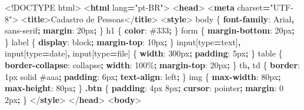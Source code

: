 \documentclass[
]{book}
\newenvironment{Shaded}{\begin{snugshade}}{\end{snugshade}}
\newcommand{\CharTok}[1]{\textcolor[rgb]{0.31,0.60,0.02}{#1}}
\newcommand{\ConstantTok}[1]{\textcolor[rgb]{0.56,0.35,0.01}{#1}}
\newcommand{\DataTypeTok}[1]{\textcolor[rgb]{0.13,0.29,0.53}{#1}}
\newcommand{\DecValTok}[1]{\textcolor[rgb]{0.00,0.00,0.81}{#1}}
\newcommand{\ExtensionTok}[1]{#1}
\newcommand{\FunctionTok}[1]{\textcolor[rgb]{0.13,0.29,0.53}{\textbf{#1}}}
\newcommand{\KeywordTok}[1]{\textcolor[rgb]{0.13,0.29,0.53}{\textbf{#1}}}
\newcommand{\NormalTok}[1]{#1}
\newcommand{\OperatorTok}[1]{\textcolor[rgb]{0.81,0.36,0.00}{\textbf{#1}}}
\newcommand{\OtherTok}[1]{\textcolor[rgb]{0.56,0.35,0.01}{#1}}
\newcommand{\SpecialStringTok}[1]{\textcolor[rgb]{0.31,0.60,0.02}{#1}}
\newcommand{\StringTok}[1]{\textcolor[rgb]{0.31,0.60,0.02}{#1}}
\begin{document}
\begin{Shaded}
\begin{Highlighting}[]
\DataTypeTok{\textless{}!DOCTYPE}\NormalTok{ html}\DataTypeTok{\textgreater{}}
\DataTypeTok{\textless{}}\KeywordTok{html}\OtherTok{ lang}\OperatorTok{=}\StringTok{"pt{-}BR"}\DataTypeTok{\textgreater{}}
\DataTypeTok{\textless{}}\KeywordTok{head}\DataTypeTok{\textgreater{}}
\DataTypeTok{\textless{}}\KeywordTok{meta}\OtherTok{ charset}\OperatorTok{=}\StringTok{"UTF{-}8"}\DataTypeTok{\textgreater{}}
\DataTypeTok{\textless{}}\KeywordTok{title}\DataTypeTok{\textgreater{}}\NormalTok{Cadastro de Pessoas}\DataTypeTok{\textless{}/}\KeywordTok{title}\DataTypeTok{\textgreater{}}
\DataTypeTok{\textless{}}\KeywordTok{style}\DataTypeTok{\textgreater{}}
\NormalTok{  body \{ }\KeywordTok{font{-}family}\CharTok{:} \DecValTok{Arial}\OperatorTok{,} \DecValTok{sans{-}serif}\OperatorTok{;} \KeywordTok{margin}\CharTok{:} \DecValTok{20}\DataTypeTok{px}\OperatorTok{;}\NormalTok{ \}}
\NormalTok{  h1 \{ }\KeywordTok{color}\CharTok{:} \ConstantTok{\#333}\OperatorTok{;}\NormalTok{ \}}
\NormalTok{  form \{ }\KeywordTok{margin{-}bottom}\CharTok{:} \DecValTok{20}\DataTypeTok{px}\OperatorTok{;}\NormalTok{ \}}
\NormalTok{  label \{ }\KeywordTok{display}\CharTok{:} \DecValTok{block}\OperatorTok{;} \KeywordTok{margin{-}top}\CharTok{:} \DecValTok{10}\DataTypeTok{px}\OperatorTok{;}\NormalTok{ \}}
\NormalTok{  input}\ExtensionTok{[}\SpecialStringTok{type}\OperatorTok{=}\StringTok{text}\ExtensionTok{]}\OperatorTok{,}\NormalTok{ input}\ExtensionTok{[}\SpecialStringTok{type}\OperatorTok{=}\StringTok{date}\ExtensionTok{]}\OperatorTok{,}\NormalTok{ input}\ExtensionTok{[}\SpecialStringTok{type}\OperatorTok{=}\StringTok{file}\ExtensionTok{]}\NormalTok{ \{}
    \KeywordTok{width}\CharTok{:} \DecValTok{300}\DataTypeTok{px}\OperatorTok{;} \KeywordTok{padding}\CharTok{:} \DecValTok{5}\DataTypeTok{px}\OperatorTok{;}
\NormalTok{  \}}
\NormalTok{  table \{ }\KeywordTok{border{-}collapse}\CharTok{:} \DecValTok{collapse}\OperatorTok{;} \KeywordTok{width}\CharTok{:} \DecValTok{100}\DataTypeTok{\%}\OperatorTok{;} \KeywordTok{margin{-}top}\CharTok{:} \DecValTok{20}\DataTypeTok{px}\OperatorTok{;}\NormalTok{ \}}
\NormalTok{  th}\OperatorTok{,}\NormalTok{ td \{ }\KeywordTok{border}\CharTok{:} \DecValTok{1}\DataTypeTok{px} \DecValTok{solid} \ConstantTok{\#aaa}\OperatorTok{;} \KeywordTok{padding}\CharTok{:} \DecValTok{6}\DataTypeTok{px}\OperatorTok{;} \KeywordTok{text{-}align}\CharTok{:} \DecValTok{left}\OperatorTok{;}\NormalTok{ \}}
\NormalTok{  img \{ }\KeywordTok{max{-}width}\CharTok{:} \DecValTok{80}\DataTypeTok{px}\OperatorTok{;} \KeywordTok{max{-}height}\CharTok{:} \DecValTok{80}\DataTypeTok{px}\OperatorTok{;}\NormalTok{ \}}
  \FunctionTok{.btn}\NormalTok{ \{ }\KeywordTok{padding}\CharTok{:} \DecValTok{4}\DataTypeTok{px} \DecValTok{8}\DataTypeTok{px}\OperatorTok{;} \KeywordTok{cursor}\CharTok{:} \DecValTok{pointer}\OperatorTok{;} \KeywordTok{margin}\CharTok{:} \DecValTok{0} \DecValTok{2}\DataTypeTok{px}\OperatorTok{;}\NormalTok{ \}}
\DataTypeTok{\textless{}/}\KeywordTok{style}\DataTypeTok{\textgreater{}}
\DataTypeTok{\textless{}/}\KeywordTok{head}\DataTypeTok{\textgreater{}}
\DataTypeTok{\textless{}}\KeywordTok{body}\DataTypeTok{\textgreater{}}


\end{Highlighting}
\end{Shaded}
\end{document}
